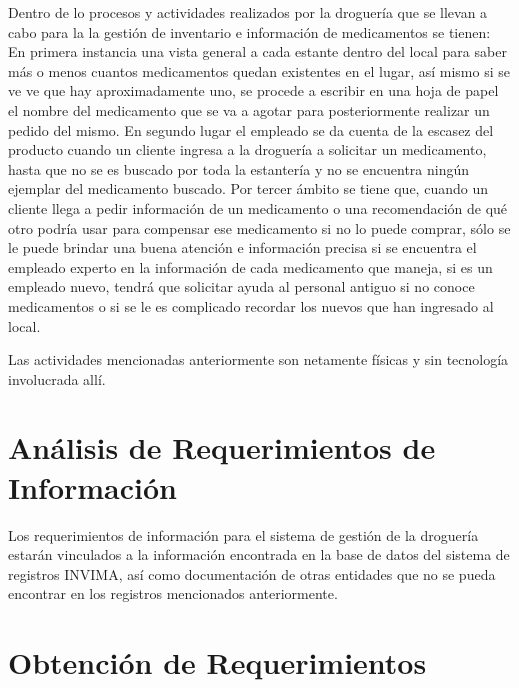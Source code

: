 Dentro de lo procesos y actividades realizados por la droguería que se llevan a cabo para la la gestión de inventario e información de medicamentos se tienen:
En primera instancia una vista general a cada estante dentro del local para saber más o menos cuantos medicamentos quedan existentes en el lugar, así mismo si se ve ve que hay aproximadamente uno, se procede a escribir en una hoja de papel el nombre del medicamento que se va a agotar para posteriormente realizar un pedido del mismo. 
En segundo lugar el empleado se da cuenta de la escasez del producto cuando un cliente ingresa a la droguería a solicitar un medicamento, hasta que no se es buscado por toda la estantería  y no se encuentra ningún ejemplar del medicamento buscado. 
Por tercer ámbito se tiene que, cuando un cliente llega a pedir información de un medicamento o una recomendación de qué otro podría usar para compensar ese medicamento si no lo puede comprar, sólo se le puede brindar una buena atención e información precisa si se encuentra el empleado experto en la información de cada medicamento que maneja, si es un empleado nuevo, tendrá que solicitar ayuda al personal antiguo si no conoce medicamentos o si se le es complicado recordar los nuevos que han ingresado al local.

Las actividades mencionadas anteriormente son netamente físicas y sin tecnología involucrada allí.


\section{An\'alisis de Requerimientos de Informaci\'on}

Los requerimientos de información para el sistema de gestión de la droguería estarán vinculados a la información encontrada en la base de datos del sistema de registros INVIMA, así como documentación de otras entidades que no se pueda encontrar en los registros mencionados anteriormente.


\section{Obtenci\'on de Requerimientos}
